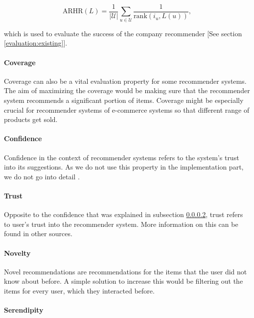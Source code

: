 \begin{equation}
\mathrm { ARHR } ( L ) = \frac { 1 } { | \mathcal { U } | } \sum _ { u \in \mathcal { U } } \frac { 1 } { \mathrm { rank } \left( i _ { u } , L ( u ) \right) } ,
\label{eq:arhr}
\end{equation}

which is used to evaluate the success of the company recommender [See section \ref{evaluation:existing}].


\paragraph{Coverage}

Coverage can also be a vital evaluation property for some recommender systems. The aim of maximizing the coverage would be making sure that the recommender system recommends a significant portion of items. Coverage might be especially crucial for recommender systems of e-commerce systems so that different range of products get sold.


\paragraph{Confidence}\label{research:confidence}

Confidence in the context of recommender systems refers to the system's trust into its suggestions. As we do not use this property in the implementation part, we do not go into detail \cite{herlocker2000explaining}.

\paragraph{Trust}

Opposite to the confidence that was explained in subsection \ref{research:confidence}, trust refers to user's trust into the recommender system. More information on this can be found in other sources.

\paragraph{Novelty}

Novel recommendations are recommendations for the items that the user did not know about before. A simple solution to increase this would be filtering out the items for every user, which they interacted before.

\paragraph{Serendipity}

